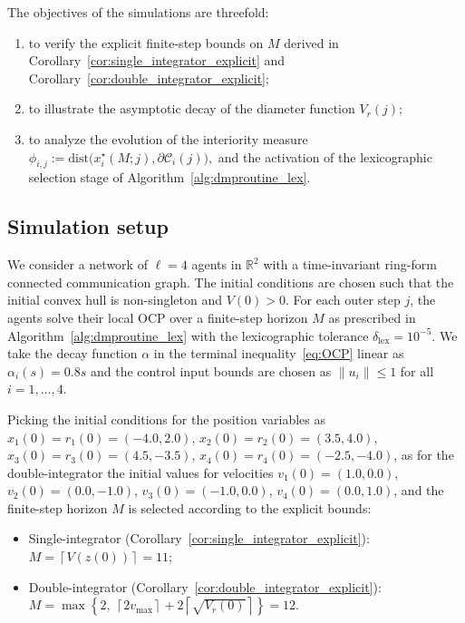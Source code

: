 \documentclass[12pt,draftcls,onecolumn]{IEEEtran}
\def\field#1{\mathbb #1}%
\def\R{\field{R}}%
\def\Cij{\mathcal{C}_i (j)}
\def\dist{\mathrm{dist}}
\begin{document}
The objectives of the simulations are threefold:
\begin{enumerate}
    \item to verify the explicit finite-step bounds on $M$ derived in Corollary~\ref{cor:single_integrator_explicit} and Corollary~\ref{cor:double_integrator_explicit};
    \item to illustrate the asymptotic decay of the diameter function $V_r(j)$;
    \item to analyze the evolution of the interiority measure
    $
        \phi_{i,j} := \dist\!\bigl(x_i^\star(M;j), \partial \Cij \bigr),
    $
    and the activation of the lexicographic selection stage of Algorithm~\ref{alg:dmproutine_lex}.
\end{enumerate}

\subsection{Simulation setup}

We consider a network of $\ell=4$ agents in $\R^2$ with a time-invariant ring-form connected communication graph.
The initial conditions are chosen such that the initial convex hull is non-singleton and $V (0) > 0$.
For each outer step $j$, the agents solve their local OCP over a finite-step horizon $M$ as prescribed in Algorithm~\ref{alg:dmproutine_lex} with the lexicographic tolerance $\delta_\mathrm{lex} = 10^{-5}$.
We take the decay function $\alpha$ in the terminal inequality~\eqref{eq:OCP} linear as $\alpha_i (s)= 0.8 s$ and the control input bounds are chosen as $\|u_i\| \le 1$ for all $i=1,\dots,4$.

Picking the initial conditions for the position variables as
$x_1(0) = r_1(0) = (-4.0,  2.0)$, $x_2(0)=r_2(0)=( 3.5,  4.0)$, $x_3(0)=r_3(0)=(4.5,-3.5)$, $x_4(0)=r_4(0)=(-2.5, -4.0)$, as for the double-integrator the initial values for velocities $v_1(0) = (1.0,  0.0)$, $v_2(0)=(0.0, -1.0)$, $v_3(0)=(-1.0,  0.0)$, $v_4(0)=(0.0,  1.0)$, and the finite-step horizon $M$ is selected according to the explicit bounds:
\begin{itemize}
    \item Single-integrator (Corollary~\ref{cor:single_integrator_explicit}):
        $M = \left\lceil V(z(0)) \right\rceil = 11$;
    \item Double-integrator (Corollary~\ref{cor:double_integrator_explicit}):
        $M = \max\!\left\{2,\ \left\lceil 2v_{\max}\right\rceil
        + 2\left\lceil \sqrt{V_r(0)}\right\rceil \right\}
        = 12$.
\end{itemize}
\end{document}
